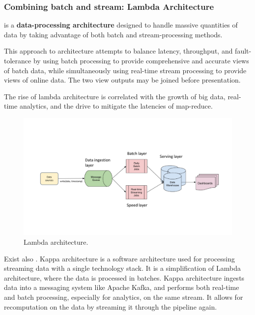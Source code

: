 \subsubsection{Combining batch and stream: Lambda Architecture}

 is a \textbf{data-processing architecture} designed to handle massive quantities of data by taking advantage of both batch and stream-processing methods. 

\highspace
This approach to architecture attempts to balance latency, throughput, and fault-tolerance by using batch processing to provide comprehensive and accurate views of batch data, while simultaneously using real-time stream processing to provide views of online data. The two view outputs may be joined before presentation. 

\highspace
The rise of lambda architecture is correlated with the growth of big data, real-time analytics, and the drive to mitigate the latencies of map-reduce.

\begin{figure}[!htp]
    \centering
    \includegraphics[width=\textwidth]{img/lambda-arch.pdf}
    \caption{Lambda architecture.}
\end{figure}

Exist also . Kappa architecture is a software architecture used for processing streaming data with a single technology stack. It is a simplification of Lambda architecture, where the data is processed in batches. Kappa architecture ingests data into a messaging system like Apache Kafka, and performs both real-time and batch processing, especially for analytics, on the same stream. It allows for recomputation on the data by streaming it through the pipeline again.